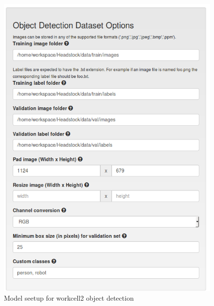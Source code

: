 \documentclass[10pt,journal,compsoc]{IEEEtran}
\begin{document}
\begin{figure}[thpb]
  \centering
  \includegraphics[width=\linewidth]{../img/Workcell2-Object-Detection/dataset/Workcell2-detectNet-Dataset.png}
  \caption{Model seetup for workcell2 object detection}
  \label{WC2-model-setup}
\end{figure}
\end{document}
